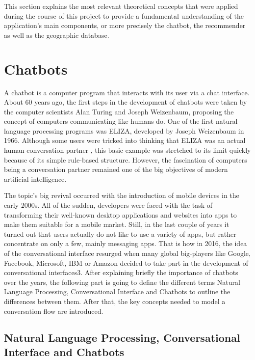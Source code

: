 \label{ch:TC}

This section explains the most relevant theoretical concepts that were applied during the course of this project to provide a fundamental understanding of the application’s main components, or more precisely the chatbot, the recommender as well as the geographic database. 

\section{Chatbots}
A chatbot is a computer program that interacts with its user via a chat interface. About 60 years ago, the first steps in the development of chatbots were taken by the computer scientists Alan Turing and Joseph Weizenbaum, proposing the concept of computers communicating like humans do. One of the first natural language processing programs was ELIZA, developed by Joseph Weizenbaum in 1966. Although some users were tricked into thinking that ELIZA was an actual human conversation partner \cite{weizenbaum66}, this basic example was stretched to its limit quickly because of its simple rule-based structure. However, the fascination of computers being a conversation partner remained one of the big objectives of modern artificial intelligence.

The topic’s big revival occurred with the introduction of mobile devices in the early 2000s. All of the sudden, developers were faced with the task of transforming their well-known desktop applications and websites into apps to make them suitable for a mobile market. Still, in the last couple of years it turned out that users actually do not like to use a variety of apps, but rather concentrate on only a few, mainly messaging apps. That is how in 2016, the idea of the conversational interface resurged when many global big-players like Google, Facebook, Microsoft, IBM or Amazon decided to take part in the development of conversational interfaces3. 
After explaining briefly the importance of chatbots over the years, the following part is going to define the different terms Natural Language Processing, Conversational Interface and Chatbots to outline the differences between them. After that, the key concepts needed to model a conversation flow are introduced.


\subsection{Natural Language Processing, Conversational Interface and Chatbots}

